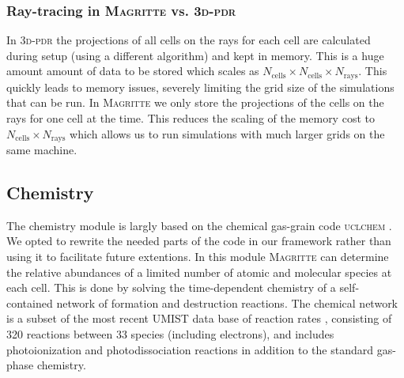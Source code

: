 \documentclass[a4paper,fleqn,usenatbib]{mnras}
\begin{document}
\subsubsection{Ray-tracing in \textsc{Magritte} vs. \textsc{3d-pdr}}

In \textsc{3d-pdr} the projections of all cells on the rays for each cell are calculated during setup (using a different algorithm) and kept in memory. This is a huge amount amount of data to be stored which scales as $N_{\text{cells}} \times N_{\text{cells}} \times N_{\text{rays}}$. This quickly leads to memory issues, severely limiting the grid size of the simulations that can be run. In \textsc{Magritte} we only store the projections of the cells on the rays for one cell at the time. This reduces the scaling of the memory cost to $N_{\text{cells}} \times N_{\text{rays}}$ which allows us to run simulations with much larger grids on the same machine.



\subsection{Chemistry}

The chemistry module is largly based on the chemical gas-grain code \textsc{uclchem} \citep{Holdship2017}. We opted to rewrite the needed parts of the code in our framework rather than using it to facilitate future extentions. In this module \textsc{Magritte} can determine the relative abundances of a limited number of atomic and molecular species at each cell. This is done by solving the time-dependent chemistry of a self-contained network of formation and destruction reactions. The chemical network is a subset of the most recent UMIST data base of reaction rates \citep{Woodall2007}, consisting of 320 reactions between 33 species (including electrons), and includes photoionization and photodissociation reactions in addition to the standard gas-phase chemistry.
\end{document}
